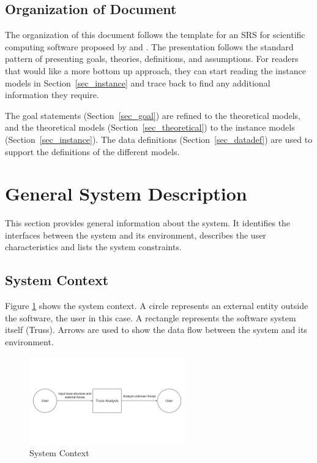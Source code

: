 \documentclass[12pt]{article}
\begin{document}
\subsection{Organization of Document}
The organization of this document follows the template for an SRS for 
scientific computing software proposed by \cite{SmithandLai2005} and 
\cite{Koothoor2013}. The presentation follows the standard pattern of 
presenting 
goals, theories, definitions, and assumptions. For readers that would like a 
more bottom up approach, they can start reading the instance models in 
Section~\ref{sec_instance} and trace back to find any additional information 
they require.

The goal statements (Section~\ref{sec_goal}) are refined to the theoretical 
models, and the theoretical models (Section~\ref{sec_theoretical}) to the 
instance models (Section~\ref{sec_instance}). The data definitions 
(Section~\ref{sec_datadef}) are used to support the definitions of the 
different models.

\section{General System Description}

This section provides general information about the system.  It identifies the
interfaces between the system and its environment, describes the user
characteristics and lists the system constraints.  

\subsection{System Context}

Figure \ref{Fig_SystemContext} shows the system context. A circle represents an 
external entity outside the software, the user in this case. A rectangle 
represents the software system itself (Truss). Arrows are used to show the data 
flow between the system and its environment. \\

\begin{figure}[h!]
\begin{center}
 \includegraphics[width=0.6\textwidth]{SystemContext}
\caption{System Context}
\label{Fig_SystemContext} 
\end{center}
\end{figure}
\end{document}
